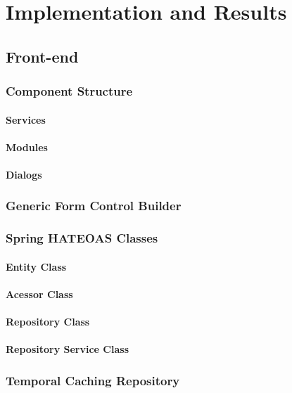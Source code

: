\chapter{Implementation and Results}
\label{cha:implementation}

\section{Front-end}
\label{cha:implementation:sec:front-end}

\subsection{Component Structure}
\subsubsection{Services}
\subsubsection{Modules}
\subsubsection{Dialogs}
\subsection{Generic Form Control Builder}
\subsection{Spring HATEOAS Classes}
\subsubsection{Entity Class}
\subsubsection{Acessor Class}
\subsubsection{Repository Class}
\subsubsection{Repository Service Class}
\subsection{Temporal Caching Repository}
